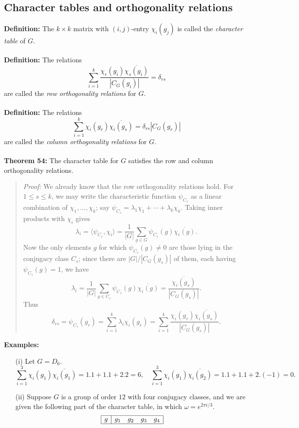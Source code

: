 {\subsection{Character tables and orthogonality relations}
{\bf Definition:} The $k\times k$ matrix with $(i,j)$-entry
$\chi_i(g_j)$ is called the \emph{character table} of $G$.
\\
\\
{\bf Definition:} The relations
$$\sum_{i=1}^k\frac{\chi_r(g_i)\overline{\chi_s(g_i)}}{|C_G(g_i)|}=\delta_{rs}$$
are called the \emph{row orthogonality relations} for $G$.
\\
\\
{\bf Definition:} The relations
$$\sum_{i=1}^k\chi_i(g_r)\overline{\chi_i(g_s)}=\delta_{rs}|C_G(g_r)|$$
are called the \emph{column orthogonality relations} for $G$.
\\
\\
{\bf Theorem 54:} The character table for $G$ satisfies the row
and column orthogonality relations.
\begin{quote}
\emph{Proof:}
We already know that the row orthogonality relations hold. For
$1\leq s\leq k$, we may write the characteristic function $\psi_{C_s}$ as a
linear combination of $\chi_1,\dots,\chi_k$; say
$\psi_{C_s}=\lambda_1\chi_1+\cdots+\lambda_k\chi_k$.
Taking inner products with $\chi_i$ gives
$$\lambda_i=\langle\psi_{C_s},\chi_i\rangle
=\frac{1}{|G|}\sum_{g\in G}\psi_{C_s}(g)\overline{\chi_i(g)}.$$
Now the only elements $g$ for which $\psi_{C_s}(g)\neq0$ are those lying in the
conjugacy class $C_s$; since there are $|G|/|C_G(g_s)|$ of
them, each having $\psi_{C_s}(g)=1$, we have
$$\lambda_i=\frac{1}{|G|}\sum_{g\in C_s}\psi_{C_s}(g)\overline{\chi_i(g)}
=\frac{\overline{\chi_i(g_s)}}{|C_G(g_s)|}.$$
Thus
$$\delta_{rs}=\psi_{C_s}(g_r)=\sum_{i=1}^k\lambda_i\chi_i(g_r)
=\sum_{i=1}^k\frac{\chi_i(g_r)\overline{\chi_i(g_s)}}{|C_G(g_r)|}.$$
\end{quote}
{\bf Examples:}
\begin{itemize}
\item[(i)] Let $G=D_6$.
$$\sum_{i=1}^3\chi_i(g_1)\overline{\chi_i(g_1)}=1.1+1.1+2.2=6,\quad
\sum_{i=1}^3\chi_i(g_1)\overline{\chi_i(g_2)}=1.1+1.1+2.(-1)=0.$$
\item[(ii)] Suppose $G$ is a group of order $12$ with four conjugacy classes,
and we are given the following part of the character table, in which
$\omega=e^{2\pi i/3}$.
$$
\begin{array}{|c|cccc|}
\hline
g&g_1&g_2&g_3&g_4\\
\hline

\end{array}$$
\end{itemize}}
